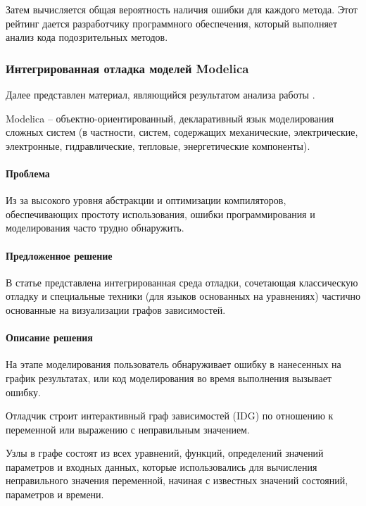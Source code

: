 Затем вычисляется общая вероятность наличия ошибки для каждого метода. Этот рейтинг дается разработчику программного обеспечения, который выполняет анализ кода подозрительных методов.

\subsubsection{Интегрированная отладка моделей Modelica}

Далее представлен материал, являющийся результатом анализа работы \cite{Pop2014}.

Modelica -- объектно-ориентированный, декларативный язык моделирования сложных систем (в частности, систем, содержащих механические, электрические, электронные, гидравлические, тепловые, энергетические компоненты). 

\paragraph{Проблема}

Из за высокого уровня абстракции и оптимизации компиляторов, обеспечивающих простоту использования, ошибки программирования и моделирования часто трудно обнаружить.

\paragraph{Предложенное решение}

В статье представлена интегрированная среда отладки, сочетающая классическую отладку и специальные техники (для языков основанных на уравнениях) частично основанные на визуализации графов зависимостей.

\paragraph{Описание решения}

На этапе моделирования пользователь обнаруживает ошибку в нанесенных на график результатах, или код моделирования во время выполнения вызывает ошибку.

Отладчик строит интерактивный граф зависимостей (IDG) по отношению к переменной или выражению с неправильным значением.

Узлы в графе состоят из всех уравнений, функций, определений значений параметров и входных данных, которые использовались для вычисления неправильного значения переменной, начиная с известных значений состояний, параметров и времени.

